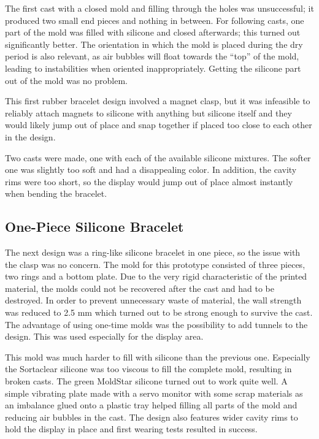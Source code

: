 The first cast with a closed mold and filling through the holes was unsuccessful; it produced two small end pieces and nothing in between. For following casts, one part of the mold was filled with silicone and closed afterwards; this turned out significantly better. The orientation in which the mold is placed during the dry period is also relevant, as air bubbles will float towards the ``top'' of the mold, leading to instabilities when oriented inappropriately. Getting the silicone part out of the mold was no problem.

This first rubber bracelet design involved a magnet clasp, but it was infeasible to reliably attach magnets to silicone with anything but silicone itself and they would likely jump out of place and snap together if placed too close to each other in the design.

Two casts were made, one with each of the available silicone mixtures. The softer one was slightly too soft and had a disappealing color. In addition, the cavity rims were too short, so the display would jump out of place almost instantly when bending the bracelet.

\subsection{One-Piece Silicone Bracelet}
The next design was a ring-like silicone bracelet in one piece, so the issue with the clasp was no concern. The mold for this prototype consisted of three pieces, two rings and a bottom plate. Due to the very rigid characteristic of the printed material, the molds could not be recovered after the cast and had to be destroyed. In order to prevent unnecessary waste of material, the wall strength was reduced to 2.5 mm which turned out to be strong enough to survive the cast. The advantage of using one-time molds was the possibility to add tunnels to the design. This was used especially for the display area.

This mold was much harder to fill with silicone than the previous one. Especially the Sortaclear silicone was too viscous to fill the complete mold, resulting in broken casts. The green MoldStar silicone turned out to work quite well. A simple vibrating plate made with a servo monitor with some scrap materials as an imbalance glued onto a plastic tray helped filling all parts of the mold and reducing air bubbles in the cast. The design also features wider cavity rims to hold the display in place and first wearing tests resulted in success.

